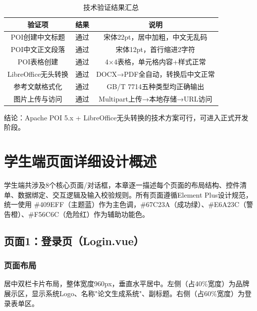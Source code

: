 \documentclass{../../softeng}
\begin{document}
\begin{table}[htbp]
\centering
\caption{技术验证结果汇总}
\label{tab:verify_result}
\begin{tabular}{|c|c|c|}
\hline
\textbf{验证项} & \textbf{结果} & \textbf{说明} \\
\hline
POI创建中文标题 & 通过 & 宋体22pt，居中加粗，中文无乱码 \\
\hline
POI中文正文段落 & 通过 & 宋体12pt，首行缩进2字符 \\
\hline
POI表格创建 & 通过 & 4×4表格，单元格内容+样式正常 \\
\hline
LibreOffice无头转换 & 通过 & DOCX→PDF全自动，转换后中文正常 \\
\hline
参考文献格式化 & 通过 & GB/T 7714五种类型均正确输出 \\
\hline
图片上传与访问 & 通过 & Multipart上传→本地存储→URL访问 \\
\hline
\end{tabular}
\end{table}

结论：Apache POI 5.x + LibreOffice无头转换的技术方案可行，可进入正式开发阶段。

\section{学生端页面详细设计概述}

学生端共涉及8个核心页面/对话框，本章逐一描述每个页面的布局结构、控件清单、数据绑定、交互逻辑及输入校验规则。所有页面遵循Element Plus设计规范，统一使用 \#409EFF（主题蓝）作为主色调，\#67C23A（成功绿）、\#E6A23C（警告橙）、\#F56C6C（危险红）作为辅助功能色。

\subsection{页面1：登录页（Login.vue）}

\subsubsection{页面布局}
居中双栏卡片布局，整体宽度960px，垂直水平居中。左侧（占40\%宽度）为品牌展示区，显示系统Logo、名称"论文生成系统"、副标题。右侧（占60\%宽度）为登录表单区。
\end{document}

